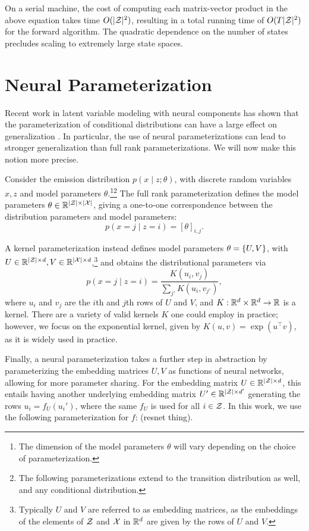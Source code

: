 \documentclass{article}
\begin{document}
On a serial machine, the cost of computing each matrix-vector product in
the above equation takes time $O(|\mathcal{Z}|^2)$, resulting in a total
running time of $O(T|\mathcal{Z}|^2)$ for the forward algorithm.
The quadratic dependence on the number of states precludes
scaling to extremely large state spaces.

\section{Neural Parameterization}
Recent work in latent variable modeling with neural components has shown
that the parameterization of conditional distributions can have a large
effect on generalization \citep{kim2019cpcfg}. 
In particular, the use of neural parameterizations can lead to stronger
generalization than full rank parameterizations.
We will now make this notion more precise.

Consider the emission distribution $p(x \mid z; \theta)$,
with discrete random variables $x,z$ and model parameters $\theta$.\footnote{
The dimension of the model parameters $\theta$ will vary depending on the choice
of parameterization.}\footnote{
The following parameterizations extend to the transition distribution as well,
and any conditional distribution.}
The full rank parameterization defines the model parameters $\theta\in\mathbb{R}^{|\mathcal{Z}|\times|\mathcal{X}|}$,
giving a one-to-one correspondence between the distribution parameters and model parameters:
$$p(x=j \mid z=i) = [\theta]_{i,j}.$$

A kernel parameterization instead defines model parameters $\theta = \left\{U,V\right\}$,
with $U\in\mathbb{R}^{|\mathcal{Z}|\times d},V\in\mathbb{R}^{|\mathcal{X}|\times d}$,\footnote{
Typically $U$ and $V$ are referred to as embedding matrices,
as the embeddings of the elements of $\mathcal{Z}$ and $\mathcal{X}$ in $\mathbb{R}^d$ are given by 
the rows of $U$ and $V$.
} and obtains the distributional
parameters via
$$p(x=j \mid z=i) = \frac{K(u_i, v_j)}{\sum_{j'} K(u_i, v_{j'})},$$
where $u_i$ and $v_j$ are the $i$th and $j$th rows of $U$ and $V$,
and $K: \mathbb{R}^d \times \mathbb{R}^d \to \mathbb{R}$ is a kernel.
There are a variety of valid kernels $K$ one could employ in practice;
however, we focus on the exponential kernel, given by $K(u, v) = \exp(u^\top v)$,
as it is widely used in practice.

Finally, a neural parameterization takes a further step in abstraction by
parameterizing the embedding matrices $U,V$ as functions of neural networks,
allowing for more parameter sharing.
For the embedding matrix $U\in\mathbb{R}^{|\mathcal{Z}|\times d}$,
this entails having another underlying embedding matrix $U'\in\mathbb{R}^{|\mathcal{Z}| \times d'}$
generating the rows $u_i = f_U(u_i')$, where the same $f_U$ is used for all $i \in \mathcal{Z}$.
In this work, we use the following parameterization for $f$:
(resnet thing).
\end{document}
